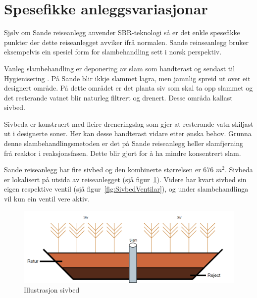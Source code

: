 \newpage
\section{Spesefikke anleggsvariasjonar}
\thispagestyle{fancy}

Sjølv om Sande reiseanlegg anvender \gls{SBR}-teknologi så er det enkle spesefikke
punkter der dette reiseanlegget avviker ifrå normalen. 
Sande reinseanlegg bruker eksempelvis ein spesiel form for slambehandling sett i norsk perspektiv.

Vanleg slambehandling er deponering av slam som handterast og sendast til \gls{Hygienisering} \citep{Slam}.
På Sande blir ikkje slammet lagra, men jamnlig spreid ut over eit designert område. På dette området er
det planta siv som skal ta opp slammet og det resterande vatnet blir naturleg filtrert og drenert.
Desse områda kallast sivbed.

Sivbeda er konstruert med fleire dreneringslag som gjer at resterande vatn skiljast ut i designerte soner.
Her kan desse handterast vidare etter ønska behov. 
Grunna denne slambehandlingsmetoden er det på Sande reiseanlegg heller slamfjerning frå reaktor
i reaksjonsfasen. Dette blir gjort for å ha mindre konsentrert slam.

Sande reiseanlegg har fire sivbed og den kombinerte størrelsen er 676 $m^2$. Sivbeda er lokalisert på utsida av reiseanlegget (sjå figur~\ref{fig:Sivbed}).\newline
Videre har kvart sivbed sin eigen respektive ventil (sjå figur~\ref{fig:SivbedVentilar}), og under slambehandlinga vil kun ein ventil vere aktiv. 
 

\begin{figure}[htbp]
    \centering
    \includegraphics[width=1\textwidth]{Figurar/Sivbed.png}
    \caption{Illustrasjon sivbed}\label{fig:Sivbed}
\end{figure}

\newpage

